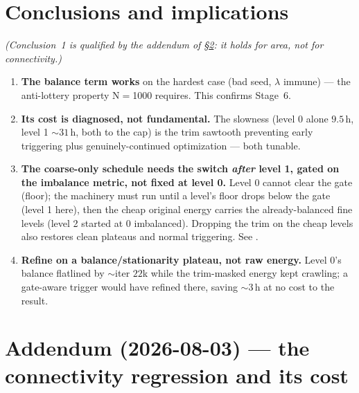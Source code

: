 \documentclass[11pt,a4paper]{article}
\begin{document}
\section{Conclusions and implications}\label{sec:conclusions}
\emph{(Conclusion~1 is qualified by the addendum of \S\ref{sec:addendum}: it holds
for area, not for connectivity.)}
\begin{enumerate}
\item \textbf{The balance term works} on the hardest case (bad seed, \(\lambda\)
  immune) --- the anti-lottery property N\(=\)1000 requires. This confirms Stage~6.
\item \textbf{Its cost is diagnosed, not fundamental.} The slowness (level 0 alone
  \(9.5\)\,h, level 1 \(\sim31\)\,h, both to the cap) is the trim sawtooth preventing
  early triggering plus genuinely-continued optimization --- both tunable.
\item \textbf{The coarse-only schedule needs the switch \emph{after} level 1, gated on
  the imbalance metric, not fixed at level 0.} Level 0 cannot clear the gate (floor);
  the machinery must run until a level's floor drops below the gate (level 1 here),
  then the cheap original energy carries the already-balanced fine levels (level 2
  started at \(0\) imbalanced). Dropping the trim on the cheap levels also restores
  clean plateaus and normal triggering. See
  .
\item \textbf{Refine on a balance/stationarity plateau, not raw energy.} Level 0's
  balance flatlined by \(\sim\)iter \(22\)k while the trim-masked energy kept crawling;
  a gate-aware trigger would have refined there, saving \(\sim\)3\,h at no cost to the
  result.
\end{enumerate}

\section{Addendum (2026-08-03) --- the connectivity regression and its
cost}\label{sec:addendum}
\end{document}
